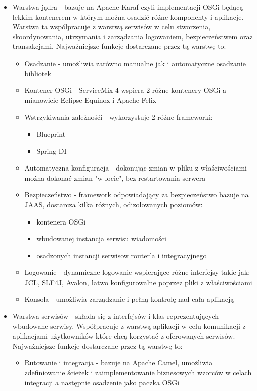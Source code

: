 \begin{itemize}
	\item Warstwa jądra - bazuje na Apache Karaf czyli implementacji OSGi będącą lekkim kontenerem w którym można osadzić różne komponenty i aplikacje. Warstwa ta wspólpracuje z warstwą serwisów w celu stworzenia, skoordynowania, utrzymania i zarządzania logowaniem, bezpieczeństwem oraz transakcjami. Najważniejsze funkcje dostarczane przez tą warstwę to:
	\begin{itemize}
		\item Osadzanie - umożliwia zarówno manualne jak i automatyczne osadzanie bibliotek
		\item Kontener OSGi - ServiceMix 4 wspiera 2 różne kontenery OSGi a mianowicie Eclipse Equinox i Apache Felix
		\item Wstrzykiwania zależnośći - wykorzystuje 2 różne frameworki:
			\begin{itemize}
				\item Blueprint
				\item Spring DI
			\end{itemize}   
		\item Automatyczna konfiguracja - dokonując zmian w pliku z właściwościami można dokonać zmian "w locie", bez restartowania serwera
		\item Bezpieczeństwo - framework odpowiadający za bezpieczeństwo bazuje na JAAS, dostarcza kilka różnych, odizolowanych poziomów:
			\begin{itemize}
				\item kontenera OSGi
				\item wbudowanej instancja serwisu wiadomości
				\item osadzonych instancji serwisow router'a i integracyjnego
			\end{itemize} 
		\item Logowanie - dynamiczne logowanie wspierające różne interfejsy takie jak: JCL, SLF4J, Avalon, łatwo konfigurowalne poprzez pliki z właściwościami
		\item Konsola - umożliwia zarządzanie i pełną kontrolę nad cała aplikacją
	\end{itemize}  
	\item Warstwa serwisów - 	składa się z interfejsów i klas reprezentujących wbudowane serwisy. Współpracuje z warstwą aplikacji w celu komunikacji z aplikacjami użytkowników które chcą korzystać z oferowanych serwisów. Najważniejsze funkcje dostarczane przez tą warstwę to:
	\begin{itemize}
		\item Rutowanie i integracja - bazuje na Apache Camel, umożliwia zdefiniowanie ścieżek i zaimplementowanie biznesowych wzorców w celach integracji a następnie osadzenie jako paczka OSGi

\end{itemize}
\end{itemize}

